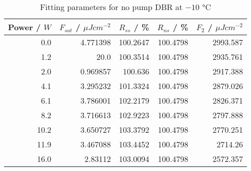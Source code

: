 \begin{table}[H]
\caption{Fitting parameters for no pump DBR at $-10$ °C}
\begin{tabular}{rrrrr}
\toprule
Power / $W$ & $F_{sat}$ / $\mu Jcm^{-2}$ & $R_{ss}$ / \% & $R_{ns}$ / \% & $F_2$ / $\mu Jcm^{-2}$ \\
\midrule
0.0 & 4.771398 & 100.2647 & 100.4798 & 2993.587 \\
1.2 & 20.0 & 100.3514 & 100.4798 & 2935.761 \\
2.0 & 0.969857 & 100.636 & 100.4798 & 2917.388 \\
4.1 & 3.295232 & 101.3324 & 100.4798 & 2879.026 \\
6.1 & 3.786001 & 102.2179 & 100.4798 & 2826.371 \\
8.2 & 3.716613 & 102.9223 & 100.4798 & 2797.888 \\
10.2 & 3.650727 & 103.3792 & 100.4798 & 2770.251 \\
11.9 & 3.467088 & 103.4452 & 100.4798 & 2714.26 \\
16.0 & 2.83112 & 103.0094 & 100.4798 & 2572.357 \\
\bottomrule
\end{tabular}
\end{table}
